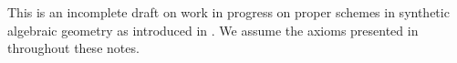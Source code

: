 
This is an incomplete draft on work in progress on proper schemes in synthetic algebraic geometry as introduced in \cite{draft}.
We assume the axioms presented in \cite{draft} throughout these notes.